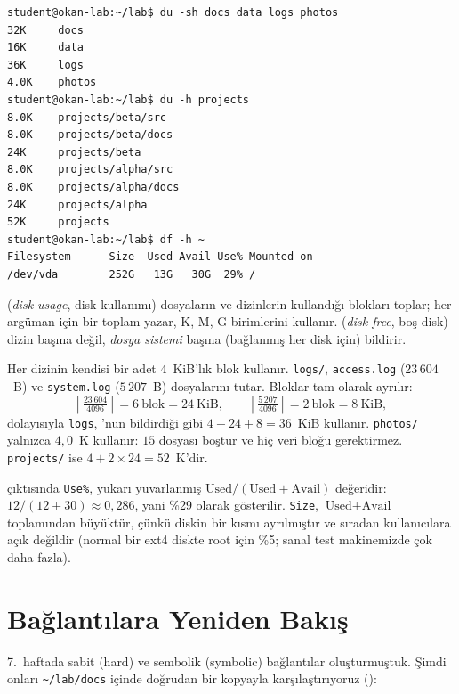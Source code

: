 \begin{lstlisting}[style=term]
student@okan-lab:~/lab$ du -sh docs data logs photos
32K     docs
16K     data
36K     logs
4.0K    photos
student@okan-lab:~/lab$ du -h projects
8.0K    projects/beta/src
8.0K    projects/beta/docs
24K     projects/beta
8.0K    projects/alpha/src
8.0K    projects/alpha/docs
24K     projects/alpha
52K     projects
student@okan-lab:~/lab$ df -h ~
Filesystem      Size  Used Avail Use% Mounted on
/dev/vda        252G   13G   30G  29% /
\end{lstlisting}

 (\emph{disk usage}, disk kullanımı) dosyaların ve dizinlerin kullandığı blokları toplar;  her argüman için bir toplam yazar,  K, M, G birimlerini kullanır.  (\emph{disk free}, boş disk) dizin başına değil, \emph{dosya sistemi} başına (bağlanmış her disk için) bildirir.

\begin{example}
Her dizinin kendisi bir adet $4$~KiB'lık blok kullanır. \texttt{logs/}, \texttt{access.log} ($23\,604$~B) ve \texttt{system.log} ($5\,207$~B) dosyalarını tutar. Bloklar tam olarak ayrılır:
\[
\left\lceil \tfrac{23\,604}{4096} \right\rceil = 6 \ \text{blok} = 24\ \text{KiB}, \qquad
\left\lceil \tfrac{5\,207}{4096} \right\rceil = 2 \ \text{blok} = 8\ \text{KiB},
\]
dolayısıyla \texttt{logs}, 'nun bildirdiği gibi $4 + 24 + 8 = 36$~KiB kullanır. \texttt{photos/} yalnızca $4{,}0$~K kullanır: $15$ dosyası boştur ve hiç veri bloğu gerektirmez. \texttt{projects/} ise $4 + 2 \times 24 = 52$~K'dir.
\end{example}

 çıktısında \texttt{Use\%}, yukarı yuvarlanmış $\text{Used}/(\text{Used} + \text{Avail})$ değeridir: $12/(12+30) \approx 0{,}286$, yani \%29 olarak gösterilir. \texttt{Size}, $\text{Used} + \text{Avail}$ toplamından büyüktür, çünkü diskin bir kısmı ayrılmıştır ve sıradan kullanıcılara açık değildir (normal bir ext4 diskte root için \%5; sanal test makinemizde çok daha fazla).

\section{Bağlantılara Yeniden Bakış}
\label{sec:links}

7.~haftada sabit (hard) ve sembolik (symbolic) bağlantılar oluşturmuştuk. Şimdi onları \texttt{\textasciitilde/lab/docs} içinde doğrudan bir kopyayla karşılaştırıyoruz ():

